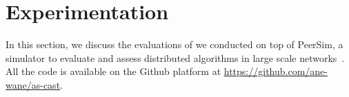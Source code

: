 \newcommand{\FIGSCALE}{0.99}

\section{Experimentation}
\label{sec:experimentation}

In this section, we discuss the evaluations of \NAME we conducted on top of
PeerSim, a simulator to
evaluate and assess distributed algorithms in large scale
networks~\cite{montresor2009peersim}. All the code is available on the
Github platform at \mbox{\url{https://github.com/ane-wane/as-cast}}.


